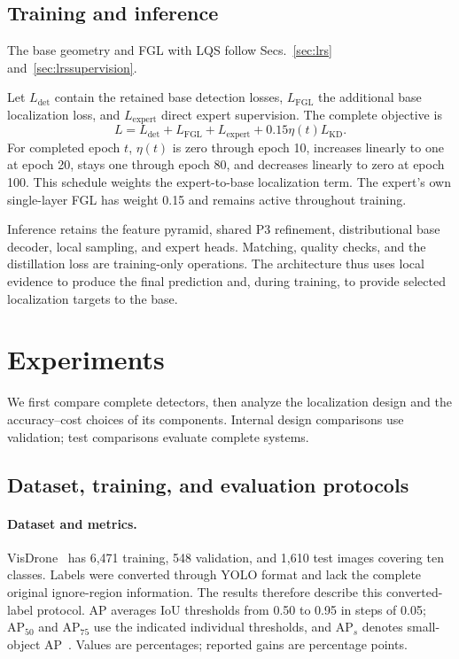 \subsection{Training and inference}
\label{sec:training}

The base geometry and FGL with LQS follow Secs.~\ref{sec:lrs} and~\ref{sec:lrssupervision}.

Let $L_{\mathrm{det}}$ contain the retained base detection losses, $L_{\mathrm{FGL}}$ the additional base localization loss, and $L_{\mathrm{expert}}$ direct expert supervision. The complete objective is
\begin{equation}
L=L_{\mathrm{det}}+L_{\mathrm{FGL}}+L_{\mathrm{expert}}
+0.15\eta(t)L_{\mathrm{KD}}.
\label{eq:objective}
\end{equation}
For completed epoch $t$, $\eta(t)$ is zero through epoch 10, increases linearly to one at epoch 20, stays one through epoch 80, and decreases linearly to zero at epoch 100. This schedule weights the expert-to-base localization term. The expert's own single-layer FGL has weight 0.15 and remains active throughout training.

Inference retains the feature pyramid, shared P3 refinement, distributional base decoder, local sampling, and expert heads. Matching, quality checks, and the distillation loss are training-only operations. The architecture thus uses local evidence to produce the final prediction and, during training, to provide selected localization targets to the base.

\section{Experiments}
We first compare complete detectors, then analyze the localization design and the accuracy--cost choices of its components. Internal design comparisons use validation; test comparisons evaluate complete systems.
\subsection{Dataset, training, and evaluation protocols}
\label{sec:protocol}
\paragraph{Dataset and metrics.}
VisDrone~\cite{zhu2018visdrone} has 6,471 training, 548 validation, and 1,610 test images covering ten classes. Labels were converted through YOLO format and lack the complete original ignore-region information. The results therefore describe this converted-label protocol. AP averages IoU thresholds from 0.50 to 0.95 in steps of 0.05; $\mathrm{AP}_{50}$ and $\mathrm{AP}_{75}$ use the indicated individual thresholds, and $\mathrm{AP}_{s}$ denotes small-object AP~\cite{lin2014coco}. Values are percentages; reported gains are percentage points.


